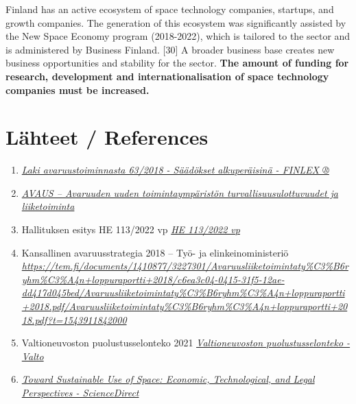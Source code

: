 \documentclass[nobib,finnish,oneside,openany,notoc,a4paper]{tufte-book}
\begin{document}
{Finland has an active ecosystem of space technology companies, startups,
and growth companies. The generation of this ecosystem was significantly
assisted by the New Space Economy program (2018-2022), which is tailored
to the sector and is administered by Business Finland. {[}30{]} A
broader business base creates new business opportunities and stability
for the sector. \textbf{The amount of funding for research, development
and internationalisation of space technology companies must be
increased.}

\chapter{Lähteet / References}

\begin{enumerate}
\def\labelenumi{\arabic{enumi}.}
\item
  \href{https://www.finlex.fi/fi/laki/alkup/2018/20180063}{\emph{Laki
  avaruustoiminnasta 63/2018 - Säädökset alkuperäisinä - FINLEX ®}}
\item
  \href{https://julkaisut.valtioneuvosto.fi/bitstream/handle/10024/162062/VNTEAS_2020_08.pdf}{\emph{AVAUS
  -- Avaruuden uuden toimintaympäristön turvallisuusulottuvuudet ja
  liiketoiminta}}
\item
  Hallituksen esitys HE 113/2022 vp
  \href{https://www.eduskunta.fi/FI/vaski/HallituksenEsitys/Sivut/HE_113+2022.aspx}{\emph{HE
  113/2022 vp}}
\item
  Kansallinen avaruusstrategia 2018 -- Työ- ja elinkeinoministeriö\emph{
  }\href{https://tem.fi/documents/1410877/3227301/Avaruusliiketoimintaty\%C3\%B6ryhm\%C3\%A4n+loppuraportti+2018/c6ea3c04-0415-31f5-12ae-dd417d045bed/Avaruusliiketoimintaty\%C3\%B6ryhm\%C3\%A4n+loppuraportti+2018.pdf/Avaruusliiketoimintaty\%C3\%B6ryhm\%C3\%A4n+loppuraportti+2018.pdf?t=1543911842000}{\emph{https://tem.fi/documents/1410877/3227301/Avaruusliiketoimintaty\%C3\%B6ryhm\%C3\%A4n+loppuraportti+2018/c6ea3c04-0415-31f5-12ae-dd417d045bed/Avaruusliiketoimintaty\%C3\%B6ryhm\%C3\%A4n+loppuraportti+2018.pdf/Avaruusliiketoimintaty\%C3\%B6ryhm\%C3\%A4n+loppuraportti+2018.pdf?t=1543911842000}}
\item
  Valtioneuvoston puolustusselonteko 2021
  \href{http://urn.fi/URN:ISBN:978-952-383-820-8}{\emph{Valtioneuvoston
  puolustusselonteko - Valto}}
\item
  \href{https://www.sciencedirect.com/science/article/pii/S0265964621000205}{\emph{Toward
  Sustainable Use of Space: Economic, Technological, and Legal
  Perspectives - ScienceDirect}}

\end{enumerate}}
\end{document}
